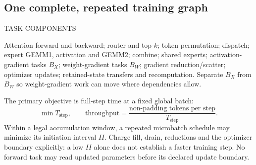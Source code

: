 \documentclass[10pt]{article}
\newcommand{\mono}{\ttfamily}
\newcommand{\ct}[1]{{\mono\fontsize{7.2}{8}\selectfont\color{ink2}\MakeUppercase{#1}}\par\vspace{2pt}}
\begin{document}
\subsection{One complete, repeated training graph}
\begin{card}
\ct{Task components}
Attention forward and backward; router and top-$k$; token permutation;
dispatch; expert GEMM1, activation and GEMM2; combine; shared experts;
activation-gradient tasks $B_X$; weight-gradient tasks $B_W$; gradient
reduction/scatter; optimizer updates; retained-state transfers and recomputation.
Separate $B_X$ from $B_W$ so weight-gradient work can move where dependencies allow.
\end{card}
The primary objective is full-step time at a fixed global batch:
\[
 \min T_{\mathrm{step}},\qquad
 \mathrm{throughput}=\frac{\text{non-padding tokens per step}}{T_{\mathrm{step}}}.
\]
Within a legal accumulation window, a repeated microbatch schedule may minimize
its initiation interval $II$. Charge fill, drain, reductions and the optimizer
boundary explicitly: a low $II$ alone does not establish a faster training step.
No forward task may read updated parameters before its declared update boundary.
\end{document}
